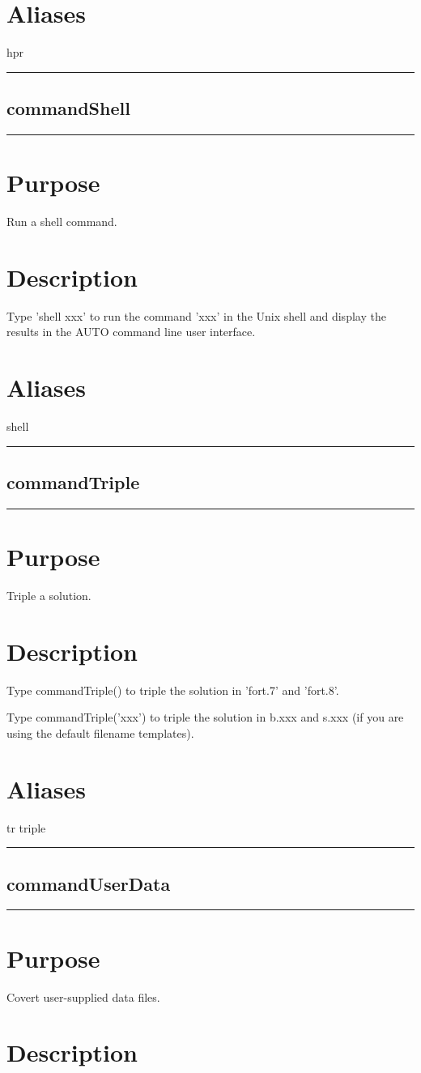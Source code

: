 \documentclass[12pt]{report}
\begin{document}
\begin{minipage}{6in}
    \section*{Aliases}
hpr \medskip\hrule\end{minipage}\subsection{commandShell} \label{sec:clui_ref_commandShell}\begin{minipage}{6in}\hrule\medskip\section*{Purpose}
Run a shell command.\section*{Description}
        
    Type 'shell xxx' to run the command 'xxx' in the Unix shell and display
    the results in the AUTO command line user interface.
    \section*{Aliases}
shell \medskip\hrule\end{minipage}\subsection{commandTriple} \label{sec:clui_ref_commandTriple}\begin{minipage}{6in}\hrule\medskip\section*{Purpose}
Triple a solution.\section*{Description}

    Type commandTriple() to triple the solution in 'fort.7' and 'fort.8'.

    Type commandTriple('xxx') to triple the solution in b.xxx and s.xxx (if you
    are using the default filename templates).
    \section*{Aliases}
tr triple \medskip\hrule\end{minipage}\subsection{commandUserData} \label{sec:clui_ref_commandUserData}\begin{minipage}{6in}\hrule\medskip\section*{Purpose}
Covert user-supplied data files.\section*{Description}


\end{minipage}
\end{document}
